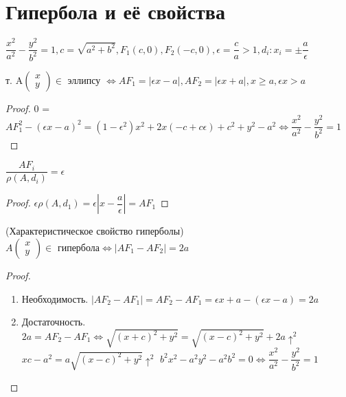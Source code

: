 \section{Гипербола и её свойства}
\(\dfrac{x^2}{a^2}-\dfrac{y^2}{b^2} = 1, c= \sqrt{a^2+b^2}, F_1(c, 0), F_2(-c, 0), \epsilon = \dfrac{c}{a}>1, d_i: x_i = \pm\dfrac{a}{\epsilon}\)
\begin{proposition}
	т. A\(\begin{pmatrix}
		x \\ y
	\end{pmatrix}\in\text{ эллипсу }\Longleftrightarrow AF_1 = |\epsilon x -a|, AF_2 = |\epsilon x + a|, x\ge a, \epsilon x > a\)
\end{proposition}
\begin{proof}
	0 = \(AF_1^2-(\epsilon x - a)^2 = (1-\epsilon^2)x^2 + 2x(-c+c\epsilon)+c^2+y^2-a^2 \Longleftrightarrow \dfrac{x^2}{a^2}-\dfrac{y^2}{b^2}=1\)
\end{proof}
\begin{corollary}
	\(\dfrac{AF_i}{\rho(A, d_i)} = \epsilon\)
\end{corollary}
\begin{proof}
	\(\epsilon\rho(A, d_1) = \epsilon|x - \dfrac{a}{\epsilon}| = AF_1\)
\end{proof}

\begin{theorem}
	(Характеристическое свойство гиперболы) \(A\begin{pmatrix}
		x \\ y
	\end{pmatrix}\in\text{ гипербола}\Longleftrightarrow |AF_1-AF_2|=2a\)
\end{theorem}
\begin{proof}
	\begin{enumerate}
		\item Необходимость. \(|AF_2 - AF_1| = AF_2 - AF_1 = \epsilon x + a -(\epsilon x - a) = 2a\)
		\item Достаточность. \(2a = AF_2 - AF_1 \Longleftrightarrow \sqrt{(x+c)^2+y^2} = \sqrt{(x-c)^2+y^2} + 2a\uparrow^2\) \newline
		\(xc - a^2 = a\sqrt{(x-c)^2+y^2}\uparrow^2\) \newline
		\(b^2x^2-a^2y^2-a^2b^2 = 0\Longleftrightarrow \dfrac{x^2}{a^2} - \dfrac{y^2}{b^2} = 1\)
	\end{enumerate}
\end{proof}

